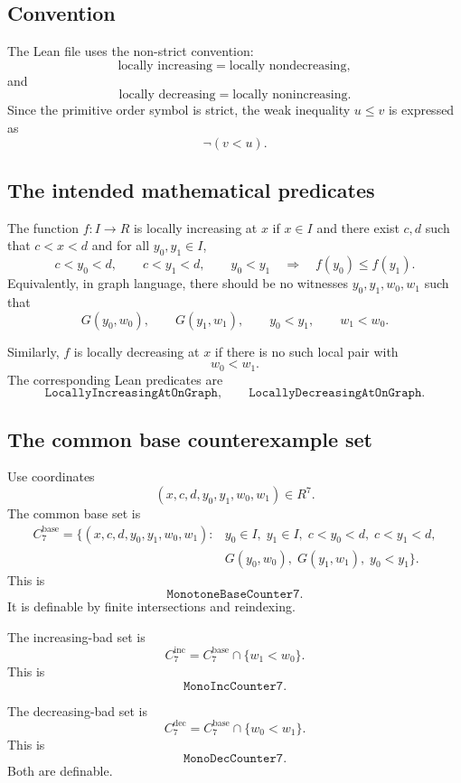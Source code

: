 \documentclass[11pt]{article}
\newcommand{\Lean}[1]{\texttt{#1}}
\begin{document}
\subsection{Convention}

The Lean file uses the non-strict convention:
\[
  \text{locally increasing}=\text{locally nondecreasing},
\]
and
\[
  \text{locally decreasing}=\text{locally nonincreasing}.
\]
Since the primitive order symbol is strict, the weak inequality $u\le v$ is expressed as
\[
  \neg(v<u).
\]

\subsection{The intended mathematical predicates}

The function $f:I\to R$ is locally increasing at $x$ if $x\in I$ and there exist $c,d$ such that
$c<x<d$ and for all $y_0,y_1\in I$,
\[
  c<y_0<d,
  \qquad
  c<y_1<d,
  \qquad
  y_0<y_1
  \quad\Longrightarrow\quad
  f(y_0)\le f(y_1).
\]
Equivalently, in graph language, there should be no witnesses $y_0,y_1,w_0,w_1$ such that
\[
  G(y_0,w_0),
  \qquad
  G(y_1,w_1),
  \qquad
  y_0<y_1,
  \qquad
  w_1<w_0.
\]

Similarly, $f$ is locally decreasing at $x$ if there is no such local pair with
\[
  w_0<w_1.
\]
The corresponding Lean predicates are
\[
  \Lean{LocallyIncreasingAtOnGraph},
  \qquad
  \Lean{LocallyDecreasingAtOnGraph}.
\]

\subsection{The common base counterexample set}

Use coordinates
\[
  (x,c,d,y_0,y_1,w_0,w_1)
  \in R^7.
\]
The common base set is
\[
\begin{aligned}
  C^{\mathrm{base}}_7=\bigl\{(x,c,d,y_0,y_1,w_0,w_1):{}&
  y_0\in I,
  \;y_1\in I,
  \;c<y_0<d,
  \;c<y_1<d,\\
  &G(y_0,w_0),
  \;G(y_1,w_1),
  \;y_0<y_1
  \bigr\}.
\end{aligned}
\]
This is
\[
  \Lean{MonotoneBaseCounter7}.
\]
It is definable by finite intersections and reindexing.

The increasing-bad set is
\[
  C^{\mathrm{inc}}_7
  =
  C^{\mathrm{base}}_7
  \cap
  \{w_1<w_0\}.
\]
This is
\[
  \Lean{MonoIncCounter7}.
\]

The decreasing-bad set is
\[
  C^{\mathrm{dec}}_7
  =
  C^{\mathrm{base}}_7
  \cap
  \{w_0<w_1\}.
\]
This is
\[
  \Lean{MonoDecCounter7}.
\]
Both are definable.
\end{document}
